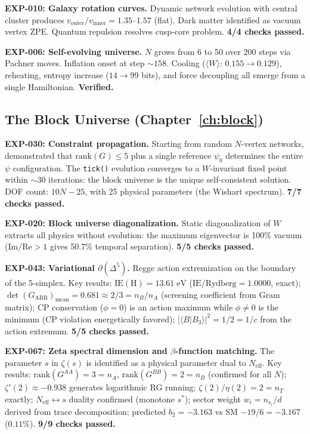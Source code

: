 \documentclass[12pt]{article}
\theoremstyle{remark}
\theoremstyle{definition}
\begin{document}
\textbf{EXP-010: Galaxy rotation curves.} Dynamic network evolution with central cluster produces $v_\text{outer}/v_\text{inner} = 1.35$--$1.57$ (flat). Dark matter identified as vacuum vertex ZPE. Quantum repulsion resolves cusp-core problem. \textbf{4/4 checks passed.}

\textbf{EXP-006: Self-evolving universe.} $N$ grows from 6 to 50 over 200 steps via Pachner moves. Inflation onset at step $\sim 158$. Cooling ($\langle W\rangle$: $0.155 \to 0.129$), reheating, entropy increase ($14 \to 99$ bits), and force decoupling all emerge from a single Hamiltonian. \textbf{Verified.}

\subsection{The Block Universe (Chapter~\ref{ch:block})}

\textbf{EXP-030: Constraint propagation.} Starting from random $N$-vertex networks, demonstrated that $\text{rank}(G) \leq 5$ plus a single reference $\psi_0$ determines the entire $\psi$ configuration. The \texttt{tick()} evolution converges to a $W$-invariant fixed point within $\sim 30$ iterations: the block universe is the unique self-consistent solution. DOF count: $10N - 25$, with 25 physical parameters (the Wishart spectrum). \textbf{7/7 checks passed.}

\textbf{EXP-020: Block universe diagonalization.} Static diagonalization of $W$ extracts all physics without evolution: the maximum eigenvector is 100\% vacuum ($\text{Im}/\text{Re} > 1$ gives 50.7\% temporal separation). \textbf{5/5 checks passed.}

\textbf{EXP-043: Variational $\partial(\Delta^5)$.}  Regge action extremization on the boundary of the 5-simplex. Key results: $\text{IE}(\text{H}) = 13.61\;\text{eV}$ ($\text{IE}/\text{Rydberg} = 1.0000$, exact); $\det(G_\text{ABB})_\text{mean} = 0.681 \approx 2/3 = n_B/n_A$ (screening coefficient from Gram matrix); CP conservation ($\phi = 0$) is an action maximum while $\phi \neq 0$ is the minimum (CP violation energetically favored); $|\langle B|B_3\rangle|^2 = 1/2 = 1/c$ from the action extremum. \textbf{5/5 checks passed.}

\textbf{EXP-067: Zeta spectral dimension and $\beta$-function matching.}  The parameter $s$ in $\zeta(s)$ is identified as a physical parameter dual to $N_\text{eff}$. Key results: $\text{rank}(G^{AA}) = 3 = n_A$, $\text{rank}(G^{BB}) = 2 = n_B$ (confirmed for all $N$); $\zeta'(2) \approx -0.938$ generates logarithmic RG running; $\zeta(2)/\eta(2) = 2 = n_T$ exactly; $N_\text{eff} \leftrightarrow s$ duality confirmed (monotone $s^*$); sector weight $w_i = n_{s_i}/d$ derived from trace decomposition; predicted $b_2 = -3.163$ vs SM $-19/6 = -3.167$ ($0.11\%$). \textbf{9/9 checks passed.}
\end{document}
